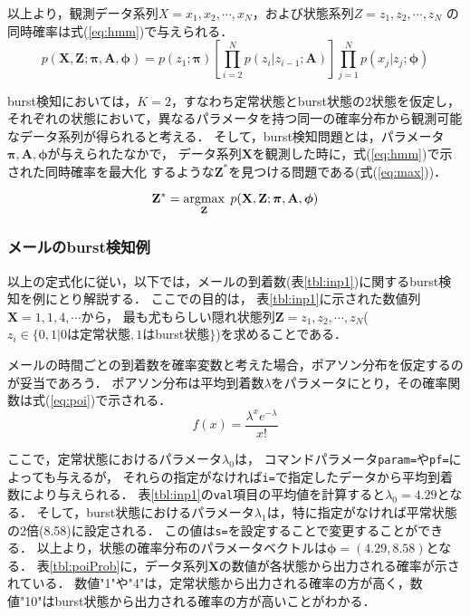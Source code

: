 以上より，観測データ系列$X=x_1,x_2,\cdots,x_N$，および状態系列$Z=z_1,z_2,\cdots,z_N$
の同時確率は式(\ref{eq:hmm})で与えられる\cite{Bishop2008}．
%
{\footnotesize
\begin{equation}
p(\mathbf{X},\mathbf{Z};\boldsymbol{\pi},\mathbf{A},\boldsymbol{\phi})=p(z_1;\boldsymbol{\pi})
\left[\prod_{i=2}^N p(z_i|z_{i-1};\mathbf{A})\right]
\prod_{j=1}^N p(x_j|z_j;\boldsymbol{\phi})
\label{eq:hmm}
\end{equation}
}

burst検知においては，$K=2$，すなわち定常状態とburst状態の2状態を仮定し，
それぞれの状態において，異なるパラメータを持つ同一の確率分布から観測可能なデータ系列が得られると考える．
そして，burst検知問題とは，パラメータ$\boldsymbol{\pi},\mathbf{A},\boldsymbol{\phi}$が与えられたなかで，
データ系列$\mathbf{X}$を観測した時に，式(\ref{eq:hmm})で示された同時確率を最大化
するような$\mathbf{Z}^*$を見つける問題である(式(\ref{eq:max}))．

\begin{equation}
\mathbf{Z}^*=\mathop{\rm argmax}\limits_{\mathbf{Z}}\; p(\mathbf{X},\mathbf{Z};\boldsymbol{\pi},\mathbf{A},\boldsymbol{\phi})
\label{eq:max}
\end{equation}


\subsubsection*{メールのburst検知例}
以上の定式化に従い，以下では，メールの到着数(表\ref{tbl:inp1})に関するburst検知を例にとり解説する．
ここでの目的は，
表\ref{tbl:inp1}に示された数値列$\mathbf{X}=1,1,4,\cdots$から，
最も尤もらしい隠れ状態列$\mathbf{Z}=z_1,z_2,\cdots,z_N$($z_i \in \{0,1|0は定常状態,1は$burst$状態\}$)を求めることである．

メールの時間ごとの到着数を確率変数と考えた場合，ポアソン分布を仮定するのが妥当であろう．
ポアソン分布は平均到着数$\lambda$をパラメータにとり，その確率関数は式(\ref{eq:poi})で示される．
\begin{equation}
f(x)=\frac{\lambda^x e^{-λ}}{x!}
\label{eq:poi}
\end{equation}

ここで，定常状態におけるパラメータ$\lambda_0$は，
コマンドパラメータ\verb|param=|や\verb|pf=|によっても与えるが，
それらの指定がなければ\verb|i=|で指定したデータから平均到着数により与えられる．
表\ref{tbl:inp1}の\verb|val|項目の平均値を計算すると$\lambda_0=4.29$となる．
そして，burst状態におけるパラメータ$\lambda_1$は，特に指定がなければ平常状態の2倍(8.58)に設定される．
この値は\verb|s=|を設定することで変更することができる．
以上より，状態の確率分布のパラメータベクトルは$\boldsymbol{\phi}=(4.29,8.58)$となる．
表\ref{tbl:poiProb}に，データ系列$\mathbf{X}$の数値が各状態から出力される確率が示されている．
数値"1"や"4"は，定常状態から出力される確率の方が高く，数値"10"はburst状態から出力される確率の方が高いことがわかる．

